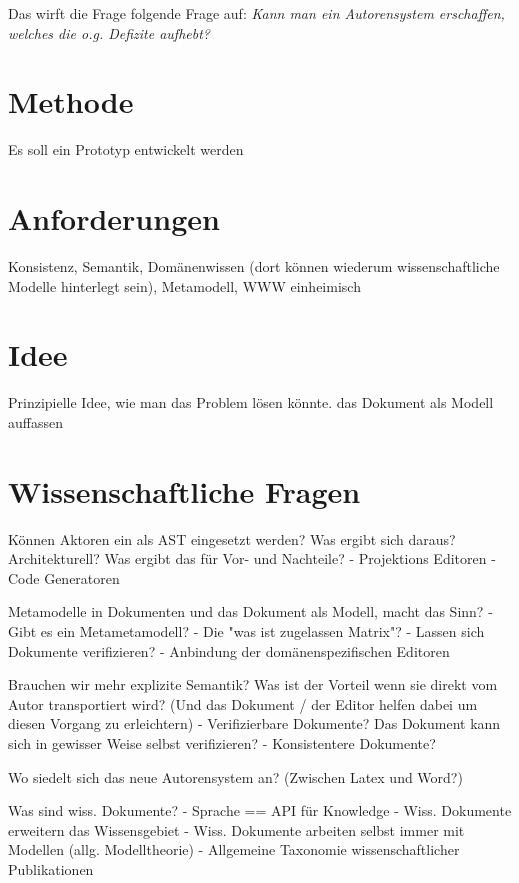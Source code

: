 Das wirft die Frage folgende Frage auf:
\emph{Kann man ein Autorensystem erschaffen,
welches die o.g. Defizite aufhebt?}


\section{Methode}

Es soll ein Prototyp entwickelt werden

\section{Anforderungen}

Konsistenz, Semantik, Domänenwissen (dort können wiederum wissenschaftliche Modelle hinterlegt sein), Metamodell, WWW einheimisch

\section{Idee}

Prinzipielle Idee, wie man das Problem lösen könnte.
das Dokument als Modell auffassen

\section{Wissenschaftliche Fragen}

Können Aktoren ein als AST eingesetzt werden?
Was ergibt sich daraus? Architekturell? Was ergibt das für Vor- und Nachteile?
  - Projektions Editoren
  - Code Generatoren

Metamodelle in Dokumenten und das Dokument als Modell, macht das Sinn?
  - Gibt es ein Metametamodell?
  - Die "was ist zugelassen Matrix"?
  - Lassen sich Dokumente verifizieren?
  - Anbindung der domänenspezifischen Editoren

Brauchen wir mehr explizite Semantik? Was ist der Vorteil wenn sie direkt
vom Autor transportiert wird? (Und das Dokument / der Editor helfen dabei
um diesen Vorgang zu erleichtern)
  - Verifizierbare Dokumente? Das Dokument kann sich in gewisser Weise selbst verifizieren?
  - Konsistentere Dokumente?

Wo siedelt sich das neue Autorensystem an? (Zwischen Latex und Word?)

Was sind wiss. Dokumente?
  - Sprache == API für Knowledge
  - Wiss. Dokumente erweitern das Wissensgebiet
  - Wiss. Dokumente arbeiten selbst immer mit Modellen (allg. Modelltheorie)
  - Allgemeine Taxonomie wissenschaftlicher Publikationen

